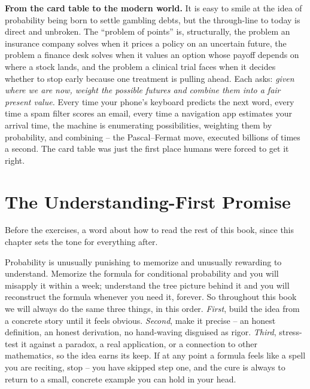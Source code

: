 \begin{applicationbox}
\textbf{From the card table to the modern world.} It is easy to smile at the idea
of probability being born to settle gambling debts, but the through-line to today
is direct and unbroken. The ``problem of points'' is, structurally, the problem an
insurance company solves when it prices a policy on an uncertain future, the
problem a finance desk solves when it values an option whose payoff depends on
where a stock lands, and the problem a clinical trial faces when it decides whether
to stop early because one treatment is pulling ahead. Each asks: \emph{given where
we are now, weight the possible futures and combine them into a fair present
value.} Every time your phone's keyboard predicts the next word, every time a spam
filter scores an email, every time a navigation app estimates your arrival time,
the machine is enumerating possibilities, weighting them by probability, and
combining -- the Pascal--Fermat move, executed billions of times a second. The
card table was just the first place humans were forced to get it right.
\end{applicationbox}

\section{The Understanding-First Promise}
\label{ch01:promise}

Before the exercises, a word about how to read the rest of this book, since this
chapter sets the tone for everything after.

\begin{focusbox}
Probability is unusually punishing to memorize and unusually rewarding to
understand. Memorize the formula for conditional probability and you will misapply
it within a week; understand the tree picture behind it and you will reconstruct
the formula whenever you need it, forever. So throughout this book we will always
do the same three things, in this order. \emph{First}, build the idea from a
concrete story until it feels obvious. \emph{Second}, make it precise -- an honest
definition, an honest derivation, no hand-waving disguised as rigor. \emph{Third},
stress-test it against a paradox, a real application, or a connection to other
mathematics, so the idea earns its keep. If at any point a formula feels like a
spell you are reciting, stop -- you have skipped step one, and the cure is always to
return to a small, concrete example you can hold in your head.
\end{focusbox}

